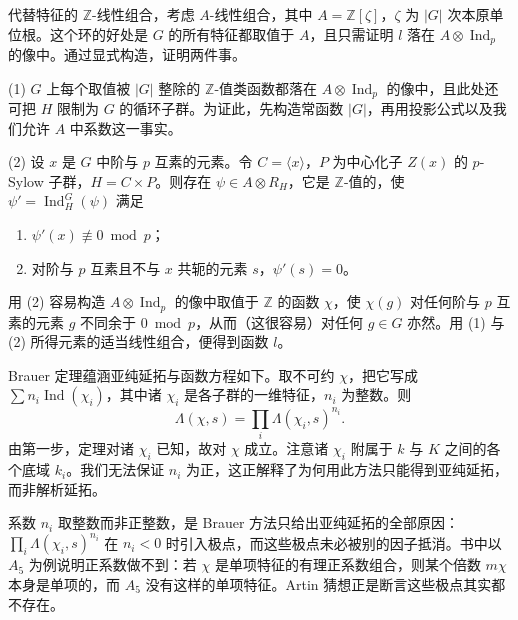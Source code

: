 代替特征的 $\mathbb{Z}$-线性组合，考虑 $A$-线性组合，其中 $A=\mathbb{Z}[\zeta]$，$\zeta$ 为 $|G|$ 次本原单位根。这个环的好处是 $G$ 的所有特征都取值于 $A$，且只需证明 $l$ 落在 $A\otimes\operatorname{Ind}_p$ 的像中。通过显式构造，证明两件事。

(1) $G$ 上每个取值被 $|G|$ 整除的 $\mathbb{Z}$-值类函数都落在 $A\otimes\operatorname{Ind}_p$ 的像中，且此处还可把 $H$ 限制为 $G$ 的循环子群。为证此，先构造常函数 $|G|$，再用投影公式以及我们允许 $A$ 中系数这一事实。

(2) 设 $x$ 是 $G$ 中阶与 $p$ 互素的元素。令 $C=\langle x\rangle$，$P$ 为中心化子 $Z(x)$ 的 $p$-Sylow 子群，$H=C\times P$。则存在 $\psi\in A\otimes R_H$，它是 $\mathbb{Z}$-值的，使 $\psi'=\operatorname{Ind}^{G}_{H}(\psi)$ 满足
\begin{enumerate}[label=(\alph*),leftmargin=2.6em,itemsep=0.2em]
\item $\psi'(x)\not\equiv0\bmod p$；
\item 对阶与 $p$ 互素且不与 $x$ 共轭的元素 $s$，$\psi'(s)=0$。
\end{enumerate}
用 (2) 容易构造 $A\otimes\operatorname{Ind}_p$ 的像中取值于 $\mathbb{Z}$ 的函数 $\chi$，使 $\chi(g)$ 对任何阶与 $p$ 互素的元素 $g$ 不同余于 $0\bmod p$，从而（这很容易）对任何 $g\in G$ 亦然。用 (1) 与 (2) 所得元素的适当线性组合，便得到函数 $l$。

Brauer 定理蕴涵亚纯延拓与函数方程如下。取不可约 $\chi$，把它写成 $\sum n_i\operatorname{Ind}(\chi_i)$，其中诸 $\chi_i$ 是各子群的一维特征，$n_i$ 为整数。则
\begin{equation}\tag{4.9}\label{c4:eq:4.9}
\Lambda(\chi,s)=\prod_{i}\Lambda(\chi_i,s)^{n_i}.
\end{equation}
由第一步，定理对诸 $\chi_i$ 已知，故对 $\chi$ 成立。注意诸 $\chi_i$ 附属于 $k$ 与 $K$ 之间的各个底域 $k_i$。我们无法保证 $n_i$ 为正，这正解释了为何用此方法只能得到亚纯延拓，而非解析延拓。

\begin{annote}
系数 $n_i$ 取整数而非正整数，是 Brauer 方法只给出亚纯延拓的全部原因：$\prod_i\Lambda(\chi_i,s)^{n_i}$ 在 $n_i<0$ 时引入极点，而这些极点未必被别的因子抵消。书中以 $A_5$ 为例说明正系数做不到：若 $\chi$ 是单项特征的有理正系数组合，则某个倍数 $m\chi$ 本身是单项的，而 $A_5$ 没有这样的单项特征。Artin 猜想正是断言这些极点其实都不存在。
\par\vspace{0.15em}{\raggedleft 【来源：Serre 前引书 Ch.~10（A）；Martinet 前引文（A）】\par}
\end{annote}

